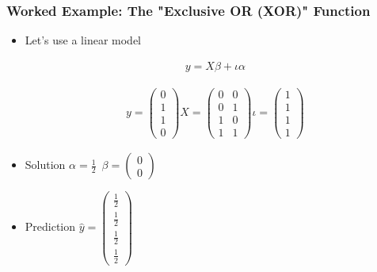 \documentclass[
  shownotes,
  xcolor={svgnames},
  hyperref={colorlinks,citecolor=DarkBlue,linkcolor=DarkRed,urlcolor=DarkBlue}
  , aspectratio=169]{beamer}
\begin{document}
\begin{frame}
\frametitle{Worked Example: The "Exclusive OR (XOR)" Function}

\begin{itemize}
\item Let's use a linear model 

\begin{align}
y = X\beta + \iota \alpha 
\end{align}


 \begin{align}
 y=\left(\begin{array}{c}
0\\
1\\
1\\
0
\end{array}\right)X=\left(\begin{array}{cc}
0 & 0\\
0 & 1\\
1 & 0\\
1 & 1
\end{array}\right)\iota=\left(\begin{array}{c}
1\\
1\\
1\\
1
\end{array}\right)
 \end{align}

\item Solution $ \alpha=\frac{1}{2} \,\,\,\beta=\left(\begin{array}{c}
0\\
0
\end{array}\right)
$


\item Prediction $\hat{y}=\left(\begin{array}{c}
\frac{1}{2}\\
\frac{1}{2}\\
\frac{1}{2}\\
\frac{1}{2}
\end{array}\right)$
\end{itemize}


\end{frame}
\end{document}
